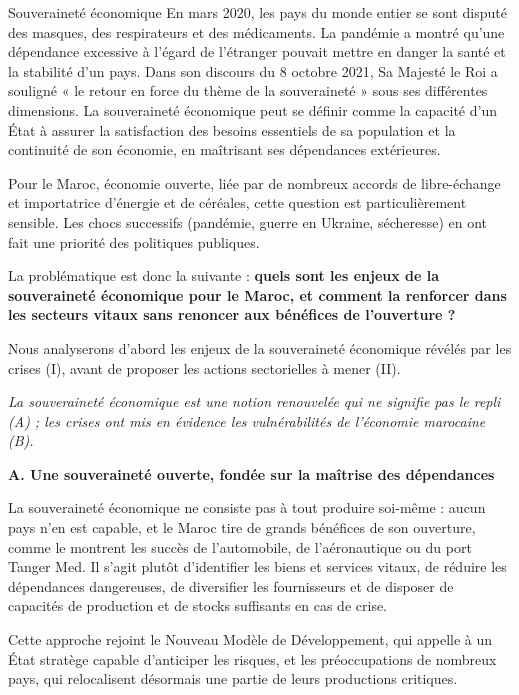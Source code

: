 \begin{copiemodele}{Souveraineté économique}
En mars 2020, les pays du monde entier se sont disputé des masques, des respirateurs et des médicaments. La pandémie a montré qu'une dépendance excessive à l'égard de l'étranger pouvait mettre en danger la santé et la stabilité d'un pays. Dans son discours du 8 octobre 2021, Sa Majesté le Roi a souligné « le retour en force du thème de la souveraineté » sous ses différentes dimensions. La souveraineté économique peut se définir comme la capacité d'un État à assurer la satisfaction des besoins essentiels de sa population et la continuité de son économie, en maîtrisant ses dépendances extérieures.

Pour le Maroc, économie ouverte, liée par de nombreux accords de libre-échange et importatrice d'énergie et de céréales, cette question est particulièrement sensible. Les chocs successifs (pandémie, guerre en Ukraine, sécheresse) en ont fait une priorité des politiques publiques.

La problématique est donc la suivante : \textbf{quels sont les enjeux de la souveraineté économique pour le Maroc, et comment la renforcer dans les secteurs vitaux sans renoncer aux bénéfices de l'ouverture ?}

Nous analyserons d'abord les enjeux de la souveraineté économique révélés par les crises (I), avant de proposer les actions sectorielles à mener (II).

\textit{La souveraineté économique est une notion renouvelée qui ne signifie pas le repli (A) ; les crises ont mis en évidence les vulnérabilités de l'économie marocaine (B).}

\textbf{A. Une souveraineté ouverte, fondée sur la maîtrise des dépendances}

La souveraineté économique ne consiste pas à tout produire soi-même : aucun pays n'en est capable, et le Maroc tire de grands bénéfices de son ouverture, comme le montrent les succès de l'automobile, de l'aéronautique ou du port Tanger Med. Il s'agit plutôt d'identifier les biens et services vitaux, de réduire les dépendances dangereuses, de diversifier les fournisseurs et de disposer de capacités de production et de stocks suffisants en cas de crise.

Cette approche rejoint le Nouveau Modèle de Développement, qui appelle à un État stratège capable d'anticiper les risques, et les préoccupations de nombreux pays, qui relocalisent désormais une partie de leurs productions critiques.


\end{copiemodele}
